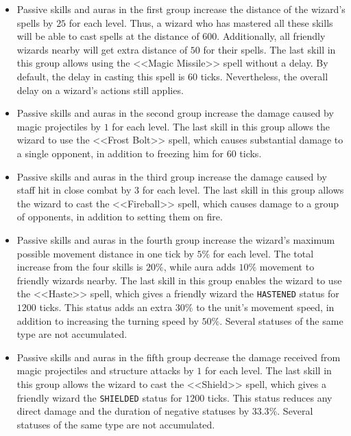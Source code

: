 \begin{itemize}
            \item Passive skills and auras in the first group increase the distance of the wizard’s spells by $25$ for each level. Thus, a wizard
            who has mastered all these skills will be able to cast spells at the distance of $600$. Additionally, all friendly wizards nearby will get
            extra distance of $50$ for their spells. The last skill in this group allows using the <<Magic Missile>> spell
            without a delay. By default, the delay in casting this spell is $60$ ticks. Nevertheless, the overall delay on a wizard’s
            actions still applies.
            \item Passive skills and auras in the second group increase the damage caused by magic projectiles by $1$ for each level. The last skill
            in this group allows the wizard to use the <<Frost Bolt>> spell, which causes substantial damage to a single opponent, in addition to
            freezing him for $60$ ticks.
            \item Passive skills and auras in the third group increase the damage caused by staff hit in close combat by $3$ for each level. The last
            skill in this group allows the wizard to cast the <<Fireball>> spell, which causes damage to a group of opponents, in addition to
            setting them on fire.
            \item Passive skills and auras in the fourth group increase the wizard’s maximum possible movement distance in one tick by $5\%$ for each level.
            The total increase from the four skills is $20\%$, while aura adds $10\%$ movement to friendly wizards
            nearby. The last skill in this group enables the wizard to use the <<Haste>> spell, which gives a friendly
            wizard the \texttt{HASTENED} status for $1200$ ticks. This status adds an extra $30\%$ to the unit’s movement speed, in addition to
            increasing the turning speed by $50\%$. Several statuses of the same type are not accumulated.
            \item Passive skills and auras in the fifth group decrease the damage received from magic projectiles and structure attacks by $1$ for each level.
            The last skill in this group allows the wizard to cast the <<Shield>> spell, which gives a friendly wizard the
            \texttt{SHIELDED} status for $1200$ ticks. This status reduces any direct damage and the duration of negative statuses by $33.3\%$.
            Several statuses of the same type are not accumulated.
\end{itemize}
 
